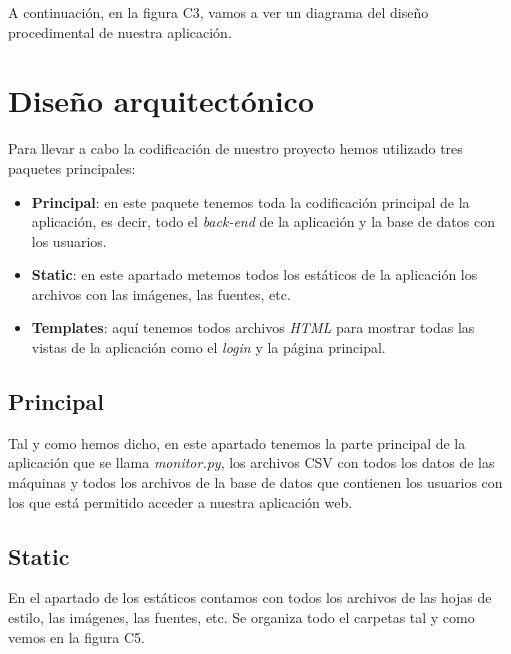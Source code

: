 A continuación, en la figura C3, vamos a ver un diagrama del diseño procedimental de nuestra aplicación.


\section{Diseño arquitectónico}

Para llevar a cabo la codificación de nuestro proyecto hemos utilizado tres paquetes principales:

\begin{itemize}
\item \textbf{Principal}: en este paquete tenemos toda la codificación principal de la aplicación, es decir, todo el \textit{back-end} de la aplicación y la base de datos con los usuarios.
\item \textbf{Static}: en este apartado metemos todos los estáticos de la aplicación los archivos con las imágenes, las fuentes, etc.
\item \textbf{Templates}: aquí tenemos todos archivos \textit{HTML} para mostrar todas las vistas de la aplicación como el \textit{login} y la página principal.
\end{itemize}

\subsection{Principal}

Tal y como hemos dicho, en este apartado tenemos la parte principal de la aplicación que se llama \textit{monitor.py}, los archivos CSV con todos los datos de las máquinas y todos los archivos de la base de datos que contienen los usuarios con los que está permitido acceder a nuestra aplicación web.


\subsection{Static}

En el apartado de los estáticos contamos con todos los archivos de las hojas de estilo, las imágenes, las fuentes, etc. Se organiza todo el carpetas tal y como vemos en la figura C5.



